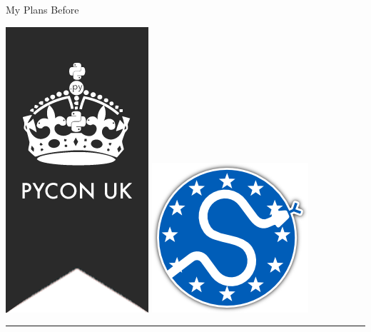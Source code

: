 \documentclass{beamer}
\begin{document}
\begin{frame}{My Plans Before}
    \begin{center}

        \includegraphics[height=0.25\textheight]{static/pyconuk.png}
        \hspace{3cm}
        \includegraphics[height=0.2\textheight]{static/euroscipy.png}
        
        \rule{\textwidth}{2pt}
        \vspace{5pt}


\end{center}
\end{frame}
\end{document}
